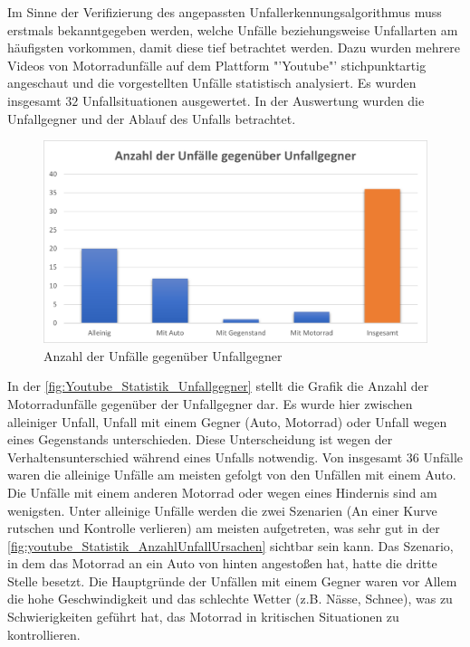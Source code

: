 Im Sinne der Verifizierung des angepassten Unfallerkennungsalgorithmus muss erstmals bekanntgegeben werden, welche Unfälle beziehungsweise Unfallarten am häufigsten vorkommen, damit diese tief betrachtet werden. Dazu wurden mehrere Videos von Motorradunfälle auf dem Plattform "'Youtube"' stichpunktartig angeschaut und die vorgestellten Unfälle statistisch analysiert. Es wurden insgesamt $32$ Unfallsituationen ausgewertet. In der Auswertung wurden die Unfallgegner und der Ablauf des Unfalls betrachtet. \citep{YTMotoCrashComp} \citep{YTCrazyDriverVsBiker} \citep{YTMotoCrashedAndMishaps} \citep{YTAnimalsVsBikers} \citep{YTMotoCrashesRoad}
\begin{figure}
	\centering
	\includegraphics[width=\linewidth]{Bilder/youtube_Statistik_Unfallgegner.png}
	\caption{Anzahl der Unfälle gegenüber Unfallgegner}
	\label{fig:Youtube_Statistik_Unfallgegner}
\end{figure}
In der \autoref{fig:Youtube_Statistik_Unfallgegner} stellt die Grafik die Anzahl der Motorradunfälle gegenüber der Unfallgegner dar. Es wurde hier zwischen alleiniger Unfall, Unfall mit einem Gegner (Auto, Motorrad) oder Unfall wegen eines Gegenstands unterschieden. Diese Unterscheidung ist wegen der Verhaltensunterschied während eines Unfalls notwendig. Von insgesamt 36 Unfälle waren die alleinige Unfälle am meisten gefolgt von den Unfällen mit einem Auto. Die Unfälle mit einem anderen Motorrad oder wegen eines Hindernis sind am wenigsten. 
Unter alleinige Unfälle werden die zwei Szenarien (An einer Kurve rutschen und Kontrolle verlieren) am meisten aufgetreten, was sehr gut in der \autoref{fig:youtube_Statistik_AnzahlUnfallUrsachen} sichtbar sein kann. Das Szenario, in dem das Motorrad an ein Auto von hinten angestoßen hat, hatte die dritte Stelle besetzt. Die Hauptgründe der Unfällen mit einem Gegner waren vor Allem die hohe Geschwindigkeit und das schlechte Wetter (z.B. Nässe, Schnee), was zu Schwierigkeiten geführt hat, das Motorrad in kritischen Situationen zu kontrollieren.

